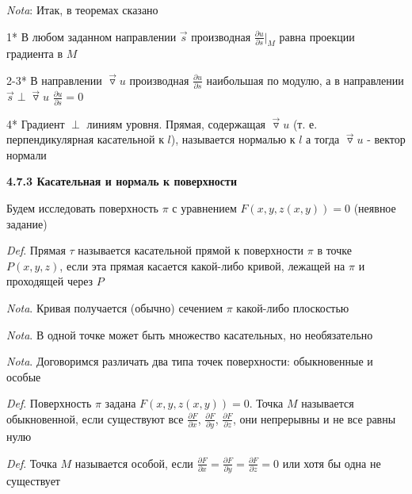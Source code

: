 \documentclass[12pt]{article}
\begin{document}
    \vspace{3mm}
\textit{Nota}: Итак, в теоремах сказано

    1* В любом заданном направлении $\overrightarrow{s}$ производная $\displaystyle \frac{\partial u}{\partial s} |_M$ равна проекции градиента в $M$

    2-3* В направлении $\overrightarrow{\triangledown} u$ производная $\displaystyle \frac{\partial u}{\partial s}$ наибольшая по модулю,
    а в направлении $\overrightarrow{s} \perp \overrightarrow{\triangledown} u$ $\displaystyle \frac{\partial u}{\partial s} = 0$

    4* Градиент $\perp$ линиям уровня.
    Прямая, содержащая $\overrightarrow{\triangledown} u$ (т. е. перпендикулярная касательной к $l$), называется нормалью к $l$
    а тогда $\overrightarrow{\triangledown} u$ - вектор нормали

    \vspace{10mm}

    \textbf{4.7.3 Касательная и нормаль к поверхности}

    Будем исследовать поверхность $\pi$ с уравнением $F(x, y, z(x, y)) = 0$ (неявное задание)

    \vspace{3mm}
\textit{Def}. Прямая $\tau$ называется касательной прямой к поверхности $\pi$ в точке $P(x, y, z)$,
    если эта прямая касается какой-либо кривой, лежащей на $\pi$ и проходящей через $P$

    \vspace{3mm}
\textit{Nota}. Кривая получается (обычно) сечением $\pi$ какой-либо плоскостью

    \vspace{3mm}
\textit{Nota}. В одной точке может быть множество касательных, но необязательно

    \vspace{3mm}
\textit{Nota}. Договоримся различать два типа точек поверхности: обыкновенные и особые

    \vspace{3mm}
\textit{Def}. Поверхность $\pi$ задана $F(x, y, z(x, y)) = 0$. Точка $M$ называется обыкновенной, если существуют
    все $\displaystyle \frac{\partial F}{\partial x}$, $\displaystyle \frac{\partial F}{\partial y}$, $\displaystyle \frac{\partial F}{\partial z}$,
    они непрерывны и не все равны нулю

    \vspace{3mm}
\textit{Def}. Точка $M$ называется особой, если $\displaystyle \frac{\partial F}{\partial x} = \frac{\partial F}{\partial y} = \frac{\partial F}{\partial z} = 0$
    или хотя бы одна не существует
\end{document}
